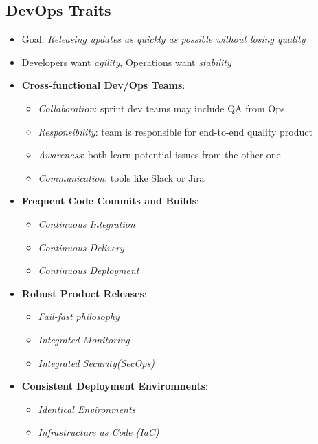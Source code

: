 \documentclass[a4paper]{article}
\begin{document}
\begin{multicols}{3}
\subsection{DevOps Traits}
\begin{itemize}
    \item Goal: \textit{Releasing updates as quickly as possible without losing quality}
    \item Developers want \textit{agility}, Operations want \textit{stability}
    \item \textbf{Cross-functional Dev/Ops Teams}:
        \begin{itemize}
            \item \textit{Collaboration}: sprint dev teams may include QA from Ops
            \item \textit{Responsibility}: team is responsible for end-to-end quality product
            \item \textit{Awareness}: both learn potential issues from the other one
            \item \textit{Communication}: tools like Slack or Jira
        \end{itemize}
    \item \textbf{Frequent Code Commits and Builds}:
        \begin{itemize}
            \item \textit{Continuous Integration}
            \item \textit{Continuous Delivery}
            \item \textit{Continuous Deployment}
        \end{itemize}
    \item \textbf{Robust Product Releases}:
        \begin{itemize}
            \item \textit{Fail-fast philosophy}
            \item \textit{Integrated Monitoring}
            \item \textit{Integrated Security(SecOps)}
        \end{itemize}
    \item \textbf{Consistent Deployment Environments}:
        \begin{itemize}
            \item \textit{Identical Environments}
            \item \textit{Infrastructure as Code (IaC)}
        \end{itemize}
\end{itemize}


\end{multicols}
\end{document}
